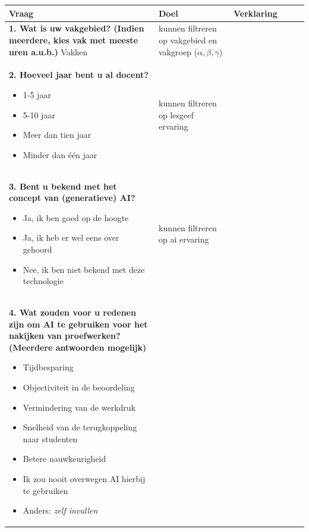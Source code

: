 \documentclass[12pt]{article}
\begin{document}
\begin{longtable}{p{0.5\linewidth}|p{0.25\linewidth}|p{0.25\linewidth}}
    Vraag & Doel & Verklaring \\
    \endhead
    \hline 
    \begin{minipage}[t]{\linewidth}
        \textbf{1. Wat is uw vakgebied? (Indien meerdere, kies vak met meeste uren a.u.b.) }
        \hspace{4em} Vakken        
    \end{minipage} & kunnen filtreren op vakgebied en vakgroep ($\alpha, \beta, \gamma$) & \\
    \hline 
    \begin{minipage}[t]{\linewidth}
        \textbf{2. Hoeveel jaar bent u al docent? }
        \begin{itemize}
            \item 1-5 jaar
            \item 5-10 jaar
            \item Meer dan tien jaar
            \item Minder dan één jaar
        \end{itemize}
    \end{minipage} & kunnen filtreren op lesgeef ervaring & \\
    \hline 
    \begin{minipage}[t]{\linewidth}
        \textbf{3. Bent u bekend met het concept van (generatieve) AI? }
        \begin{itemize}
            \item Ja, ik ben goed op de hoogte
            \item Ja, ik heb er wel eens over gehoord
            \item Nee, ik ben niet bekend met deze technologie
        \end{itemize}
    \end{minipage} & kunnen filtreren op ai ervaring & \\
    \hline 
    \begin{minipage}[t]{\linewidth}
        \textbf{4. Wat zouden voor u redenen zijn om AI te gebruiken voor het nakijken van proefwerken? (Meerdere antwoorden mogelijk) }
        \begin{itemize}
            \item Tijdbesparing
            \item Objectiviteit in de beoordeling
            \item Vermindering van de werkdruk
            \item Snelheid van de terugkoppeling naar studenten
            \item Betere nauwkeurigheid
            \item Ik zou nooit overwegen AI hierbij te gebruiken
            \item Anders: \textit{zelf invullen}


\end{itemize}
\end{minipage}
\end{longtable}
\end{document}
